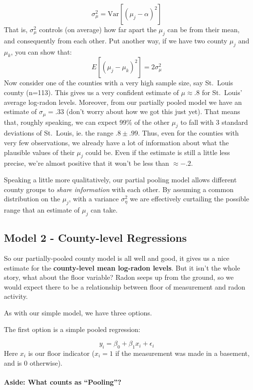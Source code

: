 \documentclass[
]{article}
\begin{document}
\[
\sigma^2_{\mu} = \text{Var}[(\mu_j - \alpha)^2]
\] That is, \(\sigma^2_{\mu}\) controls (on average) how far apart the
\(\mu_j\) can be from their mean, and consequently from each other. Put
another way, if we have two county \(\mu_j\) and \(\mu_k\), you can show
that: \[
E[(\mu_j - \mu_k)^2] = 2 \sigma^2_{\mu}
\] Now consider one of the counties with a very high sample size, say
St.~Louis county (n=113). This gives us a very confident estimate of
\(\mu \approx .8\) for St.~Louis' average log-radon levels. Moreover,
from our partially pooled model we have an estimate of
\(\sigma_{\mu}=.33\) (don't worry about how we got this just yet). That
means that, roughly speaking, we can expect 99\% of the other \(\mu_j\)
to fall with 3 standard deviations of St.~Louis, ie. the range
\(.8 \pm .99\). Thus, even for the counties with very few observations,
we already have a lot of information about what the plausible values of
their \(\mu_j\) could be. Even if the estimate is still a little less
precise, we're almost positive that it won't be less than
\(\approx -.2\).

Speaking a little more qualitatively, our partial pooling model allows
different county groups to \emph{share information} with each other. By
assuming a common distribution on the \(\mu_j\), with a variance
\(\sigma^2_{\eta}\) we are effectively curtailing the possible range
that an estimate of \(\mu_j\) can take.

\hypertarget{model-2---county-level-regressions}{%
\subsection{Model 2 - County-level
Regressions}\label{model-2---county-level-regressions}}

So our partially-pooled county model is all well and good, it gives us a
nice estimate for the \textbf{county-level mean log-radon levels}. But
it isn't the whole story, what about the floor variable? Radon seeps up
from the ground, so we would expect there to be a relationship between
floor of measurement and radon activity.

As with our simple model, we have three options.

The first option is a simple pooled regression:

\[
y_i = \beta_0 + \beta_1 x_i + \epsilon_i
\] Here \(x_i\) is our floor indicator (\(x_i=1\) if the measurement was
made in a basement, and is 0 otherwise).

\hypertarget{aside-what-counts-as-pooling}{%
\paragraph{Aside: What counts as
``Pooling''?}\label{aside-what-counts-as-pooling}}
\end{document}
